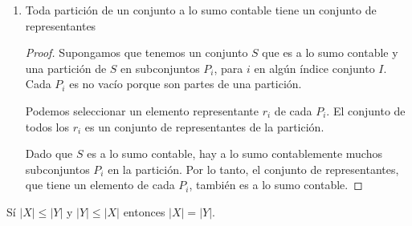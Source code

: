 \documentclass{article}
\begin{document}
\begin{enumerate}
\begin{proof}
      Dado que $S$ es a lo sumo contable, hay a lo sumo contablemente muchos subconjuntos $P_i$ en la partición. Por lo tanto, el conjunto de representantes, que tiene un elemento de cada $P_i$, también es a lo sumo contable.
    \end{proof}

  \item Toda partición de un conjunto a lo sumo contable tiene un conjunto de representantes\\ 
    \begin{proof}
      Supongamos que tenemos un conjunto $S$ que es a lo sumo contable y una partición de $S$ en subconjuntos $P_i$, para $i$ en algún índice conjunto $I$. Cada $P_i$ es no vacío porque son partes de una partición.

      Podemos seleccionar un elemento representante $r_i$ de cada $P_i$. El conjunto de todos los $r_i$ es un conjunto de representantes de la partición.

      Dado que $S$ es a lo sumo contable, hay a lo sumo contablemente muchos subconjuntos $P_i$ en la partición. Por lo tanto, el conjunto de representantes, que tiene un elemento de cada $P_i$, también es a lo sumo contable.
    \end{proof}
\end{enumerate}

\begin{tcolorbox}[colback=gray!7!white,colframe=green!5!black, title=Teorema Cantor-Bernstein.]
Sí $|X| \leq |Y|$ y $|Y| \leq |X|$ entonces $|X| = |Y|$. 
\end{tcolorbox}



\end{document}
